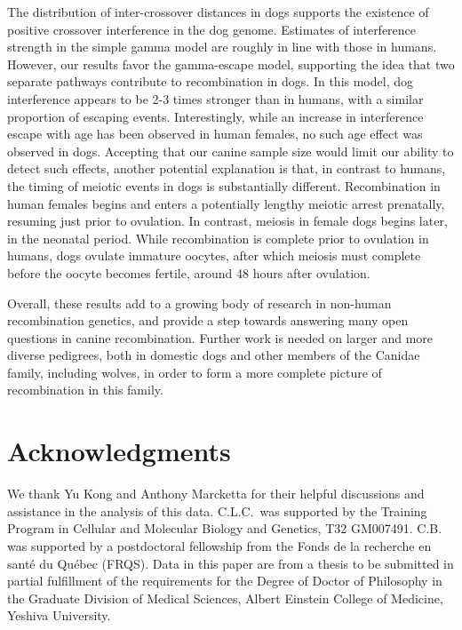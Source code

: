 The distribution of inter-crossover distances in dogs supports the existence of positive crossover interference in the dog genome.
Estimates of interference strength in the simple gamma model are roughly in line with those in humans.
However, our results favor the gamma-escape model, supporting the idea that two separate pathways contribute to recombination in dogs.
In this model, dog interference appears to be 2-3 times stronger than in humans, with a similar proportion of escaping events.
Interestingly, while an increase in interference escape with age has been observed in human females\cite{Campbell2015}, no such age effect was observed in dogs.
Accepting that our canine sample size would limit our ability to detect such effects, another
potential explanation is that, in contrast to humans, 
the timing of meiotic events in dogs is substantially different.
Recombination in human females begins and enters a potentially lengthy meiotic arrest prenatally, resuming just prior to ovulation.
In contrast, meiosis in female dogs begins later, in the neonatal period.
While recombination is complete prior to ovulation in humans, dogs ovulate immature oocytes, after which meiosis must complete before the oocyte becomes fertile, around 48 hours after ovulation\cite{Freixa1987,Chastant-Maillard2011}.

Overall, these results add to a growing body of research in non-human recombination genetics, 
and provide a step towards answering many open questions in canine recombination.
Further work is needed on larger and more diverse pedigrees, both in domestic dogs and other members of the Canidae family, including wolves, in order to form a more complete picture of recombination in this family.

\section{Acknowledgments}
We thank Yu Kong and Anthony Marcketta for their helpful discussions and assistance in the analysis of this data.
C.L.C.\ was supported by the Training Program in Cellular and Molecular Biology and Genetics, T32 GM007491.
C.B. was supported by a postdoctoral fellowship from the Fonds de la recherche en sant\'{e} du Qu\'{e}bec (FRQS).
Data in this paper are from a thesis to be submitted in partial fulfillment of the requirements for the Degree of Doctor of Philosophy in the Graduate Division of Medical Sciences, Albert Einstein College of Medicine, Yeshiva University.


\clearpage
\renewcommand{\bibname}{References}

\begingroup
    \setlength{\bibsep}{10pt}
    \linespread{1}\selectfont
    
\endgroup

